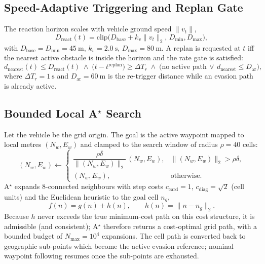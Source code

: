 \subsection{Speed-Adaptive Triggering and Replan Gate}
The reaction horizon scales with vehicle ground speed $\lVert v_t\rVert$,
\begin{equation}
D_{\text{react}}(t)=\mathrm{clip}\!\big(D_{\text{base}}+k_v\lVert v_t\rVert_2,\,
D_{\min},D_{\max}\big),
\end{equation}
with $D_{\text{base}}=D_{\min}=\SI{45}{\meter}$, $k_v=\SI{2.0}{\second}$,
$D_{\max}=\SI{80}{\meter}$. A replan is requested at $t$ iff the nearest active
obstacle is inside the horizon and the rate gate is satisfied:
\begin{equation}
d_{\text{nearest}}(t)\le D_{\text{react}}(t)
\;\wedge\;
\big(t-t^{\text{replan}}\big)\ge \Delta T_r
\;\wedge\;
\big(\text{no active path}\,\vee\, d_{\text{nearest}}\le D_{\text{ar}}\big),
\end{equation}
where $\Delta T_r=\SI{1}{\second}$ and $D_{\text{ar}}=\SI{60}{\meter}$ is the
re-trigger distance while an evasion path is already active.

\subsection{Bounded Local A\texorpdfstring{$^\star$}{*} Search}
Let the vehicle be the grid origin. The goal is the active waypoint mapped to
local metres $(N_w,E_w)$ and clamped to the search window of radius
$\rho=40$ cells:
\begin{equation}
(N_w,E_w)\leftarrow
\begin{cases}
\dfrac{\rho\delta}{\lVert(N_w,E_w)\rVert_2}\,(N_w,E_w), & \lVert(N_w,E_w)\rVert_2>\rho\delta,\\[4pt]
(N_w,E_w), & \text{otherwise.}
\end{cases}
\end{equation}
A$^\star$ expands 8-connected neighbours with step costs
$c_{\text{card}}=1$, $c_{\text{diag}}=\sqrt2$ (cell units) and the Euclidean
heuristic to the goal cell $n_g$,
\begin{equation}
f(n)=g(n)+h(n),\qquad h(n)=\lVert n-n_g\rVert_2 .
\end{equation}
Because $h$ never exceeds the true minimum-cost path on this cost structure,
it is admissible (and consistent); A$^\star$ therefore returns a cost-optimal
grid path, with a bounded budget of $N_{\max}=10^4$ expansions. The cell path
is converted back to geographic sub-points which become the active evasion
reference; nominal waypoint following resumes once the sub-points are
exhausted.

